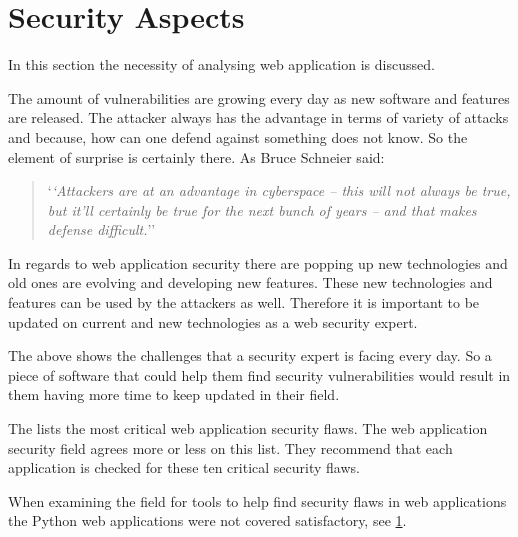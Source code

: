 \section{Security Aspects}
In this section the necessity of analysing web application is discussed.

The amount of vulnerabilities are growing every day as new software and features are released.
The attacker always has the advantage in terms of variety of attacks and because, how can one defend against something does not know.
So the element of surprise is certainly there.
As Bruce Schneier said:
\begin{quote}
`\textit{`Attackers are at an advantage in cyberspace – this will not always be true, but it’ll certainly be true for the next bunch of years – and that makes defense difficult.}''\cite{schneier_interview}  
\end{quote}

In regards to web application security there are popping up new technologies and old ones are evolving and developing new features.
These new technologies and features can be used by the attackers as well.
Therefore it is important to be updated on current and new technologies as a web security expert.\cite{web_security_importance}

The above shows the challenges that a security expert is facing every day.
So a piece of software that could help them find security vulnerabilities would result in them having more time to keep updated in their field.

The \citet{OWASP10} lists the most critical web application security flaws.
The web application security field agrees more or less on this list.
They recommend that each application is checked for these ten critical security flaws.

When examining the field for tools to help find security flaws in web applications the Python web applications were not covered satisfactory, see \cref{}.
